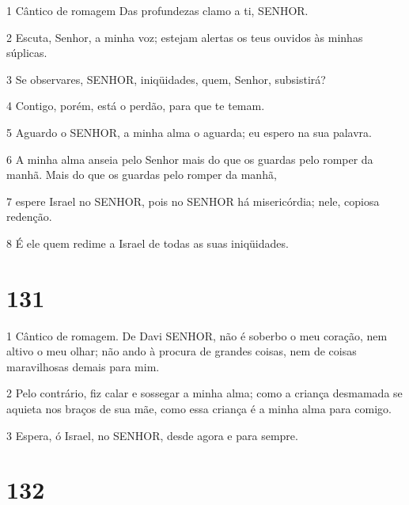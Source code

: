 \par 1 Cântico de romagem Das profundezas clamo a ti, SENHOR.
\par 2 Escuta, Senhor, a minha voz; estejam alertas os teus ouvidos às minhas súplicas.
\par 3 Se observares, SENHOR, iniqüidades, quem, Senhor, subsistirá?
\par 4 Contigo, porém, está o perdão, para que te temam.
\par 5 Aguardo o SENHOR, a minha alma o aguarda; eu espero na sua palavra.
\par 6 A minha alma anseia pelo Senhor mais do que os guardas pelo romper da manhã. Mais do que os guardas pelo romper da manhã,
\par 7 espere Israel no SENHOR, pois no SENHOR há misericórdia; nele, copiosa redenção.
\par 8 É ele quem redime a Israel de todas as suas iniqüidades.

\chapter{131}

\par 1 Cântico de romagem. De Davi SENHOR, não é soberbo o meu coração, nem altivo o meu olhar; não ando à procura de grandes coisas, nem de coisas maravilhosas demais para mim.
\par 2 Pelo contrário, fiz calar e sossegar a minha alma; como a criança desmamada se aquieta nos braços de sua mãe, como essa criança é a minha alma para comigo.
\par 3 Espera, ó Israel, no SENHOR, desde agora e para sempre.

\chapter{132}

